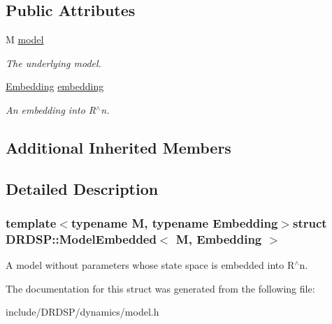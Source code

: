 \subsection*{Public Attributes}
\begin{DoxyCompactItemize}
\item 
\hypertarget{struct_d_r_d_s_p_1_1_model_embedded_aa7f54a15defe7ff2157559a1c0d7f22c}{M \hyperlink{struct_d_r_d_s_p_1_1_model_embedded_aa7f54a15defe7ff2157559a1c0d7f22c}{model}}\label{struct_d_r_d_s_p_1_1_model_embedded_aa7f54a15defe7ff2157559a1c0d7f22c}

\begin{DoxyCompactList}\small\item\em The underlying model. \end{DoxyCompactList}\item 
\hypertarget{struct_d_r_d_s_p_1_1_model_embedded_a52bceea77c9ddd837c36aba500705060}{\hyperlink{struct_d_r_d_s_p_1_1_embedding}{Embedding} \hyperlink{struct_d_r_d_s_p_1_1_model_embedded_a52bceea77c9ddd837c36aba500705060}{embedding}}\label{struct_d_r_d_s_p_1_1_model_embedded_a52bceea77c9ddd837c36aba500705060}

\begin{DoxyCompactList}\small\item\em An embedding into R$^\wedge$n. \end{DoxyCompactList}\end{DoxyCompactItemize}
\subsection*{Additional Inherited Members}


\subsection{Detailed Description}
\subsubsection*{template$<$typename M, typename Embedding$>$struct D\-R\-D\-S\-P\-::\-Model\-Embedded$<$ M, Embedding $>$}

A model without parameters whose state space is embedded into R$^\wedge$n. 

The documentation for this struct was generated from the following file\-:\begin{DoxyCompactItemize}
\item 
include/\-D\-R\-D\-S\-P/dynamics/model.\-h\end{DoxyCompactItemize}
